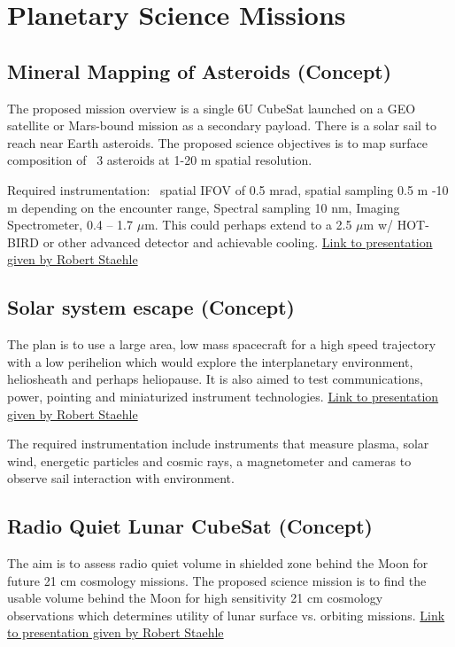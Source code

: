 \section{Planetary Science Missions}

\subsection{Mineral Mapping of Asteroids (Concept)}
The proposed mission overview is a single 6U CubeSat launched on a GEO satellite 
or Mars-bound mission as a secondary payload. There is a solar sail to reach near Earth asteroids. The proposed science objectives is to map surface composition of ~3 asteroids at 1-20 m spatial resolution.

Required instrumentation: ~spatial IFOV of 0.5 mrad, spatial sampling 0.5 m -10 m depending on the encounter range, Spectral sampling 10 nm, Imaging Spectrometer, 0.4 – 1.7 $\mu$m. This could perhaps extend to a 2.5 $\mu$m w/ HOT-BIRD or other advanced detector and achievable cooling. \href{http://kiss.caltech.edu/cosponsored/cubesat2012/presentations/staehle-interplanetary-cubesat-missions.pdf}{Link to presentation given by Robert Staehle}

\subsection{Solar system escape (Concept)}
The plan is to use a large area, low mass spacecraft for a high speed trajectory with a low perihelion which would explore the interplanetary environment, heliosheath and perhaps heliopause. It is also aimed to test communications, power, pointing and miniaturized instrument technologies.  \href{http://kiss.caltech.edu/cosponsored/cubesat2012/presentations/staehle-interplanetary-cubesat-missions.pdf}{Link to presentation given by Robert Staehle}

The required instrumentation include instruments that measure plasma, solar wind, energetic particles and cosmic rays, a magnetometer and cameras to observe sail interaction with environment.


\subsection{Radio Quiet Lunar CubeSat (Concept)}
The aim is to assess radio quiet volume in shielded zone behind the Moon for future 21 cm cosmology missions. The proposed science mission is to find the usable volume behind the Moon for high sensitivity 21 cm cosmology observations which determines utility of lunar surface vs. orbiting missions.  \href{http://kiss.caltech.edu/cosponsored/cubesat2012/presentations/staehle-interplanetary-cubesat-missions.pdf}{Link to presentation given by Robert Staehle}

